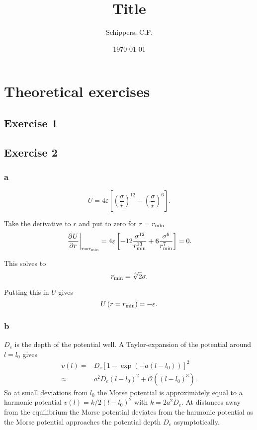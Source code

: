 \documentclass[titlepage]{report}
\title{Title}
\author{Schippers, C.F.}
\date{\today}
\begin{document}
\setAbstract{}
\inserttitletoc

\listoftodos
\newpage

\chapter{Theoretical exercises}
\section{Exercise 1}

\section{Exercise 2}
\subsection{a}
\begin{equation}
	U = 4 \varepsilon \left[ \left(\frac{\sigma}{r}\right)^{12} - \left(\frac{\sigma}{r}\right)^6\right].
\end{equation}

Take the derivative to $ r $ and put to zero for $ r = r_{\rm{min}} $
\begin{equation}
	\left. \frac{\partial^{} {U}}{\partial {r}^{}} \right|_{r=r_{\rm{min}}} = 4 \varepsilon \left[ -12 \frac{\sigma^{12}}{r_{\rm{min}}^{13}} + 6\frac{\sigma^{6}}{r_{\rm{min}}^{7}} \right] = 0.
\end{equation}

This solves to
\begin{equation}
	r_{\rm{min}} = \sqrt[6]{2} \sigma.
\end{equation}

Putting this in $ U $ gives
\begin{equation}
	U\left(r = r_{\rm{min}}\right) = - \varepsilon.
\end{equation}

\subsection{b}
$ D_e $ is the depth of the potential well. 
A Taylor-expansion of the potential around $ l = l_0 $ gives
\begin{subequations}
	\begin{align}
		v(l) =& D_e \left[ 1 - \exp\left(-a (l-l_0)\right) \right]^2 \\
		\approx& a^2 D_e (l-l_0)^2 + \mathcal{O}\left((l-l_0)^3\right).
	\end{align}
\end{subequations}
So at small deviations from $ l_0 $ the Morse potential is approximately equal to a harmonic potential $ v(l) = k/2 (l-l_0)^2 $ with $ k = 2 a^2 D_e $.
At distances away from the equilibrium the Morse potential deviates from the harmonic potential as the Morse potential approaches the potential depth $ D_e $ asymptotically.
\begin{figure}
	\centering
	
	\caption{}
	\label{fig:THEX2b}
\end{figure}
\end{document}
